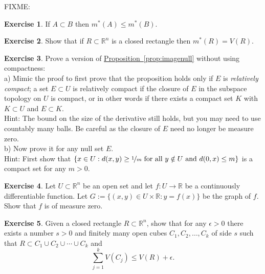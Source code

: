 \documentclass[12pt]{book}
\newcommand{\R}{{\mathbb{R}}}
\newcommand{\myindex}[1]{#1\index{#1}}
\theoremstyle{plain}
\theoremstyle{remark}
\theoremstyle{definition}
\theoremstyle{exercise}
\newtheorem{exercise}{Exercise}[section]
\theoremstyle{example}
\newcommand{\propref}[1]{\hyperref[#1]{Proposition~\ref*{#1}}}
\begin{document}
FIXME:


\begin{exercise}
If $A \subset B$ then $m^*(A) \leq m^*(B)$.
\end{exercise}

\begin{exercise}
Show that if $R \subset \R^n$ is a closed rectangle then $m^*(R) = V(R)$.
\end{exercise}

\begin{exercise}
Prove a version of \propref{prop:imagenull} without using compactness:\\
a) Mimic the proof to first prove that the proposition holds only if $E$ is
\emph{\myindex{relatively compact}}; a set $E \subset U$ is relatively
compact if the closure of $E$ in the subspace topology on $U$ is compact,
or in other words if there exists a compact set $K$ with $K \subset U$
and $E \subset K$.\\
Hint: The bound on the size of the derivative still holds, but you may need
to use countably many balls.  Be careful as the closure of $E$ need no
longer be measure zero.\\
b) Now prove it for any null set $E$.\\
Hint: First show that $\{ x \in U : d(x,y) \geq
\nicefrac{1}{m} \text{ for all $y \notin U$ and } d(0,x) \leq m \}$ is a compact set for
any $m > 0$.
\end{exercise}

\begin{exercise}
Let $U \subset \R^n$ be an open set
and let $f \colon U \to \R$ be a continuously differentiable function.
Let $G := \{ (x,y) \in U \times \R : y = f(x) \}$ be the graph of $f$.
Show that $f$ is of measure zero.
\end{exercise}

\begin{exercise}
Given a closed rectangle $R \subset \R^n$, show that for any $\epsilon > 0$
there exists a number $s > 0$ and finitely many open cubes $C_1,C_2,\ldots,C_k$
of side $s$ such that
$R \subset C_1 \cup C_2 \cup \cdots \cup C_k$
and
\begin{equation*}
\sum_{j=1}^k V(C_j) \leq V(R) + \epsilon .
\end{equation*}
\end{exercise}
\end{document}
